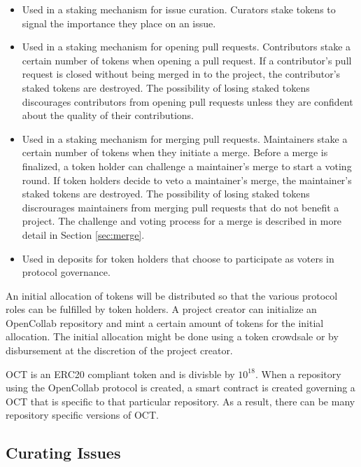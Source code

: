 \begin{itemize}
  \item Used in a staking mechanism for issue curation. Curators stake tokens to
    signal the importance they place on an issue.
  \item Used in a staking mechanism for opening pull requests. Contributors
    stake a certain number of tokens when opening a pull request. If a
    contributor's pull request is closed without being merged in to the project,
    the contributor's staked tokens are destroyed. The possibility of losing
    staked tokens discourages contributors from opening pull requests unless
    they are confident about the quality of their contributions.
  \item Used in a staking mechanism for merging pull requests. Maintainers stake
    a certain number of tokens when they initiate a merge. Before a merge is
    finalized, a token holder can challenge a maintainer's merge to start a
    voting round. If token holders decide to veto a maintainer's merge, the
    maintainer's staked tokens are destroyed. The possibility of losing staked
    tokens discrourages maintainers from merging pull requests that do not
    benefit a project. The challenge and voting process for a merge is described
    in more detail in Section \ref{sec:merge}.
  \item Used in deposits for token holders that choose to participate as voters
    in protocol governance.
\end{itemize}

An initial allocation of tokens will be distributed so that the various protocol
roles can be fulfilled by token holders. A project creator can initialize an OpenCollab repository and mint a certain amount of
tokens for the initial allocation. The initial allocation might be done using a
token crowdsale or by disbursement at the discretion of the project creator.

OCT is an ERC20 compliant token\cite{erc20} and is divisble by $10^{18}$. When a
repository using the OpenCollab protocol is created, a smart contract is created
governing a OCT that is specific to that particular repository. As a result,
there can be many repository specific versions of OCT.

\subsection{Curating Issues}

